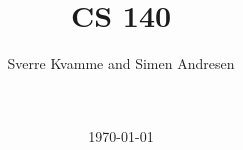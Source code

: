 \newcommand{\figurepath}{./figures/}
\newcommand{\figurescale}{0.6}
\newcommand{\codepath}{../matlab/}




\title{ CS 140}
\author{Sverre Kvamme and Simen Andresen}
\date{\ \\ \ \\ \today}




\maketitle


\pagestyle{fancy}
\lhead{}
\rhead{\thepage}
\setcounter{page}{1}

\rhead{\thepage}
\cfoot{}


%



